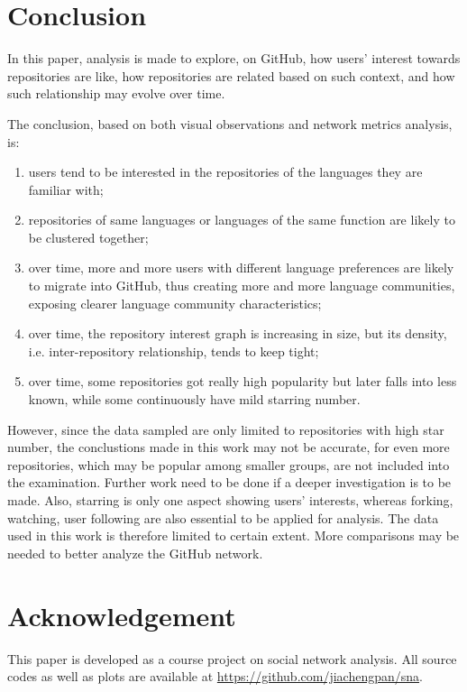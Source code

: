 \documentclass[11pt]{article}
\begin{document}
\section{Conclusion}

In this paper, analysis is made to explore, on GitHub, how users' interest towards repositories are like, how repositories are related based on such context, and how such relationship may evolve over time.

The conclusion, based on both visual observations and network metrics analysis, is:
\begin{enumerate}
\item users tend to be interested in the repositories of the languages they are familiar with;
\item repositories of same languages or languages of the same function are likely to be clustered together;
\item over time, more and more users with different language preferences are likely to migrate into GitHub, thus creating more and more language communities, exposing clearer language community characteristics;
\item over time, the repository interest graph is increasing in size, but its density, i.e. inter-repository relationship, tends to keep tight;
\item over time, some repositories got really high popularity but later falls into less known, while some continuously have mild starring number.
\end{enumerate}

However, since the data sampled are only limited to repositories with high star number, the conclustions made in this work may not be accurate, for even more repositories, which may be popular among smaller groups, are not included into the examination. Further work need to be done if a deeper investigation is to be made.
Also, starring is only one aspect showing users' interests, whereas forking, watching, user following are also essential to be applied for analysis. The data used in this work is therefore limited to certain extent. More comparisons may be needed to better analyze the GitHub network.

\section{Acknowledgement}

This paper is developed as a course project on social network analysis\cite{snacourse}.
All source codes as well as plots are available at \url{https://github.com/jiachengpan/sna}.

{\small


}
\end{document}
